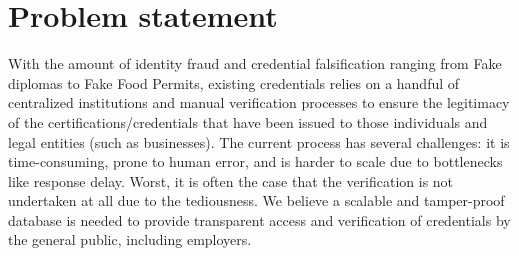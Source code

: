 \section{Problem statement}

With the amount of identity fraud and credential falsification ranging from Fake diplomas to Fake Food Permits, existing credentials relies on a handful of centralized institutions and manual verification processes to ensure the legitimacy of the certifications/credentials that have been issued to those individuals and legal entities (such as businesses). The current process has several challenges: it is time-consuming, prone to human error, and is harder to scale due to bottlenecks like response delay. Worst, it is often the case that the verification is not undertaken at all due to the tediousness. We believe a scalable and tamper-proof database is needed to provide transparent access and verification of credentials by the general public, including employers.
